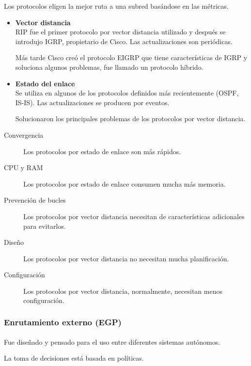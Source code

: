 \documentclass[a4paper,11pt]{article}
\begin{document}
  Los protocolos eligen la mejor ruta a una subred basándose en las métricas. 
  
\begin{itemize}
  \item \textbf{Vector distancia}\\
  RIP fue el primer protocolo por vector distancia utilizado y después se introdujo IGRP, propietario de Cisco. Las actualizaciones son periódicas.  
  
  Más tarde Cisco creó el protocolo EIGRP que tiene características de IGRP y soluciona algunos problemas, fue llamado un protocolo híbrido. 
  
  \item \textbf{Estado del enlace}\\
  Se utiliza en algunos de los protocolos definidos más recientemente (OSPF, IS-IS). Las actualizaciones se producen por eventos.
  
  Solucionaron los principales problemas de los protocolos por vector distancia.
  
\end{itemize}

  \begin{description}
    \item[Convergencia] Los protocolos por estado de enlace son más rápidos.
    \item[CPU y RAM] Los protocolos por estado de enlace consumen mucha más memoria.
    \item[Prevención de bucles] Los protocolos por vector distancia necesitan de características adicionales para evitarlos.
    \item[Diseño] Los protocolos por vector distancia no necesitan mucha planificación.
    \item[Configuración] Los protocolos por vector distancia, normalmente, necesitan menos configuración.
  \end{description}


\subsubsection{Enrutamiento externo (EGP)}
\paragraph{  }
Fue diseñado y pensado para el uso entre diferentes sistemas autónomos.

La toma de decisiones está basada en políticas.
\end{document}
